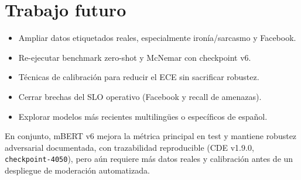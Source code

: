 \section{Trabajo futuro}

\begin{itemize}[leftmargin=*]
  \item Ampliar datos etiquetados reales, especialmente ironía/sarcasmo y Facebook.
  \item Re-ejecutar benchmark zero-shot y McNemar con checkpoint v6.
  \item Técnicas de calibración para reducir el ECE sin sacrificar robustez.
  \item Cerrar brechas del SLO operativo (Facebook y recall de amenazas).
  \item Explorar modelos más recientes multilingües o específicos de español.
\end{itemize}

En conjunto, mBERT v6 mejora la métrica principal en test y mantiene robustez
adversarial documentada, con trazabilidad reproducible (CDE v1.9.0,
\texttt{checkpoint-4050}), pero aún requiere más datos reales y calibración
antes de un despliegue de moderación automatizada.
